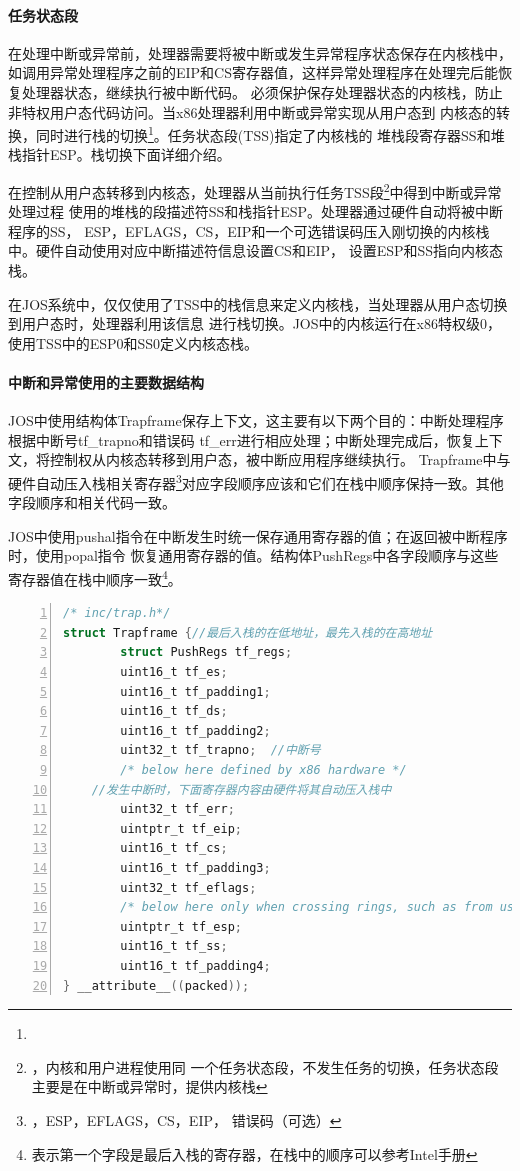 \documentclass[12pt,openany,a4paper]{report}
\begin{document}
	\paragraph{任务状态段}
	    在处理中断或异常前，处理器需要将被中断或发生异常程序状态保存在内核栈中，
	如调用异常处理程序之前的EIP和CS寄存器值，这样异常处理程序在处理完后能恢复处理器状态，继续执行被中断代码。
	必须保护保存处理器状态的内核栈，防止非特权用户态代码访问。当x86处理器利用中断或异常实现从用户态到
	内核态的转换，同时进行栈的切换\footnote{}。任务状态段(TSS)指定了内核栈的
	堆栈段寄存器SS和堆栈指针ESP。栈切换下面详细介绍。\par
	    在控制从用户态转移到内核态，处理器从当前执行任务TSS段\footnote{，内核和用户进程使用同
	一个任务状态段，不发生任务的切换，任务状态段主要是在中断或异常时，提供内核栈}中得到中断或异常处理过程
	使用的堆栈的段描述符SS和栈指针ESP。处理器通过硬件自动将被中断程序的SS，
	ESP，EFLAGS，CS，EIP和一个可选错误码压入刚切换的内核栈中。硬件自动使用对应中断描述符信息设置CS和EIP，
	设置ESP和SS指向内核态栈。\par
	    在JOS系统中，仅仅使用了TSS中的栈信息来定义内核栈，当处理器从用户态切换到用户态时，处理器利用该信息
	进行栈切换。JOS中的内核运行在x86特权级0，使用TSS中的ESP0和SS0定义内核态栈。\par
	\paragraph{中断和异常使用的主要数据结构}
	    JOS中使用结构体Trapframe保存上下文，这主要有以下两个目的：中断处理程序根据中断号tf\_trapno和错误码
	tf\_err进行相应处理；中断处理完成后，恢复上下文，将控制权从内核态转移到用户态，被中断应用程序继续执行。
	Trapframe中与硬件自动压入栈相关寄存器\footnote{，ESP，EFLAGS，CS，EIP，
	错误码（可选）}对应字段顺序应该和它们在栈中顺序保持一致。其他字段顺序和相关代码一致。\par

	    JOS中使用pushal指令在中断发生时统一保存通用寄存器的值；在返回被中断程序时，使用popal指令
	恢复通用寄存器的值。结构体PushRegs中各字段顺序与这些寄存器值在栈中顺序一致\footnote{
	表示第一个字段是最后入栈的寄存器，在栈中的顺序可以参考Intel手册}。\par
		\begin{lstlisting}[language=C,numbers=left,numberstyle=\tiny,keywordstyle=\color{blue},frame=shadowbox,rulesepcolor=\color{red!20!green!20!blue!20},commentstyle=\color{red!50!green!50!blue!50!}\selectfont,basicstyle=\ttfamily\fontsize{8}{8}\selectfont]
/* inc/trap.h*/
struct Trapframe {//最后入栈的在低地址，最先入栈的在高地址
        struct PushRegs tf_regs;
        uint16_t tf_es;
        uint16_t tf_padding1;
        uint16_t tf_ds;
        uint16_t tf_padding2;
        uint32_t tf_trapno;  //中断号
        /* below here defined by x86 hardware */
	//发生中断时，下面寄存器内容由硬件将其自动压入栈中
        uint32_t tf_err;    
        uintptr_t tf_eip;
        uint16_t tf_cs;
        uint16_t tf_padding3;
        uint32_t tf_eflags;
        /* below here only when crossing rings, such as from user to kernel */
        uintptr_t tf_esp;
        uint16_t tf_ss;
        uint16_t tf_padding4;
} __attribute__((packed));
		\end{lstlisting}
\end{document}
